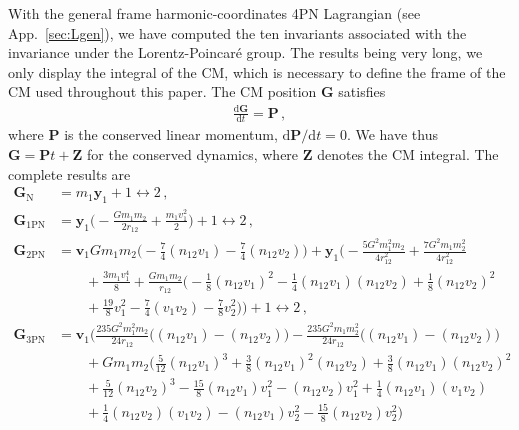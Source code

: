 \documentclass[prd,preprint,superscriptaddress,tightenlines,nofootinbib,
  eqsecnum,showpacs]{revtex4}
\newcommand{\ud}{\mathrm{d}}
\begin{document}
With the general frame harmonic-coordinates 4PN Lagrangian (see
App.~\ref{sec:Lgen}), we have computed the ten invariants associated with the
invariance under the Lorentz-Poincar\'e group. The results being very long, we
only display the integral of the CM, which is necessary to define the frame of
the CM used throughout this paper. The CM position $\bm{G}$ satisfies
%
\begin{align}\label{dGdt}
\frac{\ud \bm{G}}{\ud t} = \bm{P}\,,
\end{align}
%
where $\bm{P}$ is the conserved linear momentum, $\ud \bm{P}/\ud t = 0$.
We have thus $\bm{G}=\bm{P} t + \bm{Z}$ for the conserved dynamics, where $\bm{Z}$ denotes the CM integral. The
complete results are
%
\begin{subequations}\label{G3PN}
\begin{align}
\bm{G}_\text{N} &= m_1 \bm{y}_1 + 1 \leftrightarrow 2\,,\\
\bm{G}_\text{1PN} &= \bm{y}_1\bigg(-\frac{G m_1 m_2}{2 r_{12}} + \frac{ m_1
  v_1^2}{2}\bigg) + 1 \leftrightarrow 2\,,\\
\bm{G}_\text{2PN} &= \bm{v}_1 G
m_1 m_2 \bigg(-\frac{7}{4} (n_{12}v_1) - 
\frac{7}{4} (n_{12}v_2)\bigg)    +  \bm{y}_1
\bigg(-\frac{5 G^2 m_1^2 m_2}{4 r_{12}^2} + \frac{7 G^2 m_1
m_2^2}{4r_{12}^2} \nonumber  \\ & \qquad +  
\frac{3 m_1 v_1^4}{8}  + \frac{G m_1
m_2}{r_{12}} 
\bigg(-\frac{1}{8} (n_{12}v_1)^2 - \frac{1}{4} (n_{12}v_1) (n_{12}v_2) +
\frac{1}{8} (n_{12}v_2)^2 \nonumber \\ & \qquad + \frac{19}{8} v_1^2  -
\frac{7}{4} 
(v_1v_2) - \frac{7}{8} v_2^2\bigg)\bigg) + 1
\leftrightarrow 2\,,\\
\bm{G}_\text{3PN} &= \bm{v}_1 \bigg( \frac{235G^2 m_1^2 m_2}{24r_{12}} \bigg(
(n_{12}v_1) - (n_{12}v_2)\bigg) - \frac{235G^2 m_1 m_2^2}{24r_{12}}
 \bigg( (n_{12}v_1) - 
(n_{12}v_2)\bigg) \nonumber \\ & \qquad + G m_1 m_2 \bigg(\frac{5}{12}
(n_{12}v_1)^3 + \frac{3}{8} 
(n_{12}v_1)^2 (n_{12}v_2) + \frac{3}{8} (n_{12}v_1) (n_{12}v_2)^2 
\nonumber \\ & \qquad +
\frac{5}{12} (n_{12}v_2)^3 
- \frac{15}{8} (n_{12}v_1) v_1^2 - (n_{12}v_2)
v_1^2 + \frac{1}{4} (n_{12}v_1) (v_1v_2) \nonumber \\ & \qquad 
+ \frac{1}{4} (n_{12}v_2) (v_1v_2) -
(n_{12}v_1) v_2^2 - \frac{15}{8} (n_{12}v_2) v_2^2\bigg)

\end{align}
\end{subequations}
\end{document}
